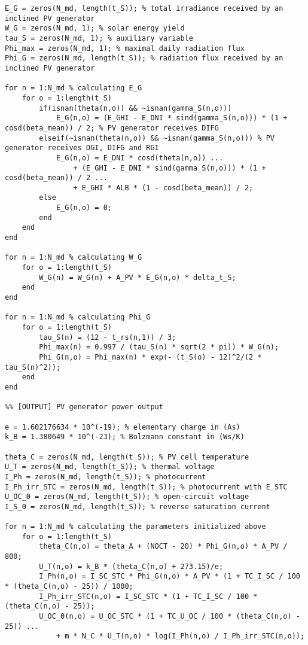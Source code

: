 \begin{lstlisting}
E_G = zeros(N_md, length(t_S)); % total irradiance received by an inclined PV generator
W_G = zeros(N_md, 1); % solar energy yield
tau_S = zeros(N_md, 1); % auxiliary variable
Phi_max = zeros(N_md, 1); % maximal daily radiation flux
Phi_G = zeros(N_md, length(t_S)); % radiation flux received by an inclined PV generator 

for n = 1:N_md % calculating E_G
    for o = 1:length(t_S)
        if(isnan(theta(n,o)) && ~isnan(gamma_S(n,o)))
            E_G(n,o) = (E_GHI - E_DNI * sind(gamma_S(n,o))) * (1 + cosd(beta_mean)) / 2; % PV generator receives DIFG
        elseif(~isnan(theta(n,o)) && ~isnan(gamma_S(n,o))) % PV generator receives DGI, DIFG and RGI
            E_G(n,o) = E_DNI * cosd(theta(n,o)) ...
                + (E_GHI - E_DNI * sind(gamma_S(n,o))) * (1 + cosd(beta_mean)) / 2 ...
                + E_GHI * ALB * (1 - cosd(beta_mean)) / 2;
        else
            E_G(n,o) = 0;
        end
    end
end

for n = 1:N_md % calculating W_G
    for o = 1:length(t_S)
        W_G(n) = W_G(n) + A_PV * E_G(n,o) * delta_t_S;
    end
end

for n = 1:N_md % calculating Phi_G
    for o = 1:length(t_S)
        tau_S(n) = (12 - t_rs(n,1)) / 3;
        Phi_max(n) = 0.997 / (tau_S(n) * sqrt(2 * pi)) * W_G(n);
        Phi_G(n,o) = Phi_max(n) * exp(- (t_S(o) - 12)^2/(2 * tau_S(n)^2));
    end
end
 
%% [OUTPUT] PV generator power output

e = 1.602176634 * 10^(-19); % elementary charge in (As)
k_B = 1.380649 * 10^(-23); % Bolzmann constant in (Ws/K)

theta_C = zeros(N_md, length(t_S)); % PV cell temperature
U_T = zeros(N_md, length(t_S)); % thermal voltage
I_Ph = zeros(N_md, length(t_S)); % photocurrent
I_Ph_irr_STC = zeros(N_md, length(t_S)); % photocurrent with E_STC
U_OC_0 = zeros(N_md, length(t_S)); % open-circuit voltage
I_S_0 = zeros(N_md, length(t_S)); % reverse saturation current

for n = 1:N_md % calculating the parameters initialized above
    for o = 1:length(t_S)
        theta_C(n,o) = theta_A + (NOCT - 20) * Phi_G(n,o) * A_PV / 800;
        U_T(n,o) = k_B * (theta_C(n,o) + 273.15)/e;
        I_Ph(n,o) = I_SC_STC * Phi_G(n,o) * A_PV * (1 + TC_I_SC / 100 * (theta_C(n,o) - 25)) / 1000;
        I_Ph_irr_STC(n,o) = I_SC_STC * (1 + TC_I_SC / 100 * (theta_C(n,o) - 25));
        U_OC_0(n,o) = U_OC_STC * (1 + TC_U_OC / 100 * (theta_C(n,o) - 25)) ...
            + m * N_C * U_T(n,o) * log(I_Ph(n,o) / I_Ph_irr_STC(n,o));
        

\end{lstlisting}

